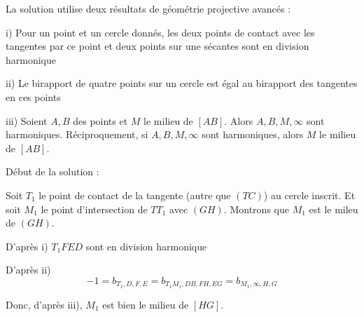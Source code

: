 \begin{sol}[99]
				
		La solution utilise deux résultats de géométrie projective avancés : 
		
		i) Pour un point et un cercle donnés, les deux points de contact avec les tangentes par ce point et deux points sur une sécantes sont en division harmonique
		
		ii) Le birapport de quatre points sur un cercle est égal au birapport des tangentes en ces points
		
		iii) Soient $A,B$ des points et $M$ le milieu de $[AB]$. Alors $A,B,M,\infty$ sont harmoniques. Réciproquement, si $A,B,M,\infty$ sont harmoniques, alors $M$ le milieu de $[AB]$.
		
		Début de la solution :
		
		Soit $T_1$ le point de contact de la tangente (autre que $(TC)$) au cercle inscrit. Et soit $M_1$ le point d'intersection de $TT_1$ avec $(GH)$. Montrons que $M_1$ est le mileu de $(GH)$.
				
		D'après i) $T_1 F E D$ sont en division harmonique
		
		D'après ii) $$-1 =b_{T_1,D,F,E}=b_{T_1M_1,DB,FH,EG}=b_{M_1,\infty,H,G}$$
		
		Donc, d'après iii), $M_1$ est bien le milieu de $[HG]$.
\end{sol}


